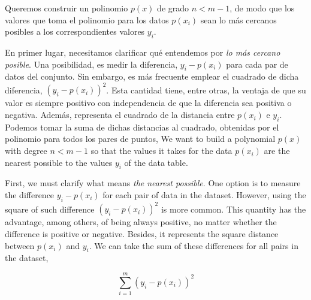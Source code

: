 \begin{paracol}{2}
Queremos construir un polinomio $p(x)$  de grado $n < m-1$, de modo que los valores que toma el polinomio para los datos $p(x_i)$ sean lo más cercanos posibles a los correspondientes valores $y_i$. 

En primer lugar, necesitamos clarificar qué entendemos por \emph{lo más cercano posible}.  Una posibilidad, es medir la diferencia, $y_i-p(x_i)$ para cada par de datos del conjunto. Sin embargo, es más frecuente emplear el cuadrado de dicha diferencia, $\left(y_i-p(x_i)\right)^2$. Esta cantidad tiene, entre otras, la ventaja de que su valor es siempre positivo con  independencia de que la diferencia sea positiva o negativa. Además, representa el cuadrado de la distancia entre $p(x_i)$ e $y_i$. Podemos tomar la suma de dichas distancias al cuadrado, obtenidas por el polinomio para todos los pares de puntos, 
\switchcolumn
We want to build a polynomial $p(x)$ with degree $n < m-1$ so that the values it takes for the data $p(x_i)$ are the nearest possible to the values  $y_i$ of the data table.

First, we must clarify what means \emph{the nearest possible}. One option is to measure the difference $y_i -p(x_i)$ for each pair of data in the dataset. However, using the square of such difference  $\left(y_i-p(x_i)\right)^2$ is more common. This quantity has the advantage, among others, of being always positive, no matter whether the difference is positive or negative. Besides, it represents the square distance between $p(x_i)$ and $y_i$. We can take the sum of these differences for all pairs in the dataset,
\end{paracol}
\begin{equation*}
\sum_{i=1}^m \left(y_i-p(x_i)\right)^2
\end{equation*}
